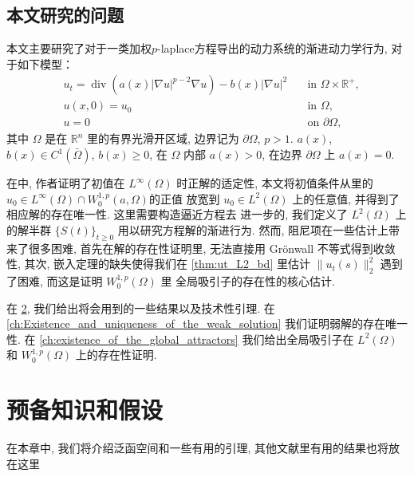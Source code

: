 \documentclass[twoside,longtitle]{LZUthesis}
\theoremstyle{definition}
\numberwithin{equation}{chapter}
\newcommand*\abs[1]{\lvert#1\rvert}
\newcommand*\norm[1]{\lVert#1\rVert}
\newcommand*\Brace[1]{\lbrace#1\rbrace}
\newcommand\R{\mathbb{R}}
\DeclareMathOperator{\Div}{div}
\begin{document}
\section{本文研究的问题}
本文主要研究了对于一类加权$p$-laplace方程导出的动力系统的渐进动力学行为, 
对于如下模型：
\begin{equation}\label{eq:main}
\begin{alignedat}{2}
& u_t = \Div(a(x)\abs{\nabla u}^{p-2}\nabla u) - b(x)\abs{\nabla u}^2 \quad &\text{in } \Omega \times \R^+,\\
& u(x,0) = u_0 \quad &\text{in } \Omega,\\
& u = 0 \quad &\text{on } \partial\Omega,
\end{alignedat}
\end{equation}
其中 $\Omega$ 是在 $\R^{n}$ 里的有界光滑开区域, 边界记为 $\partial\Omega$, $p>1$.
$ a(x)$, $b(x) \in C^1(\bar{\Omega}) $, $b(x) \geq 0$, 在 $\Omega$ 内部 $a(x) > 0$, 在边界 $\partial\Omega$ 上 $a(x) = 0$.

在\citep{Zhan2019Uniquenessa}中, 作者证明了初值在 $L^\infty(\Omega)$ 时正解的适定性, 
本文将初值条件从\citep{Zhan2019Uniquenessa}里的$u_0 \in L^{\infty}(\Omega) \cap W_0^{1,p}(a,\Omega)$的正值
放宽到 $u_0 \in L^2(\Omega)$ 上的任意值, 并得到了相应解的存在唯一性.
这里需要构造逼近方程去
进一步的, 我们定义了 $L^2(\Omega) $ 上的解半群 $\Brace{S(t)}_{t \geq 0} $ 用以研究方程解的渐进行为.
然而, 阻尼项在一些估计上带来了很多困难, 首先在解的存在性证明里,
无法直接用 Gr\"onwall 不等式得到收敛性,
其次, 嵌入定理的缺失使得我们在 \cref{thm:ut_L2_bd} 里估计
$\norm{u_t(s)}_2^2$ 遇到了困难, 而这是证明 $W_0^{1,p}(\Omega)$ 里
全局吸引子的存在性的核心估计.

在 \cref{ch:preliminaries}, 
我们给出将会用到的一些结果以及技术性引理. 在
\cref{ch:Existence_and_uniqueness_of_the_weak_solution}
我们证明弱解的存在唯一性.
在 \cref{ch:existence_of_the_global_attractors}
我们给出全局吸引子在
$L^2(\Omega)$ 和 $W_0^{1,p}(\Omega)$ 上的存在性证明.

\chapter{预备知识和假设}\label{ch:preliminaries}
在本章中, 我们将介绍泛函空间和一些有用的引理, 
其他文献里有用的结果也将放在这里
\end{document}
